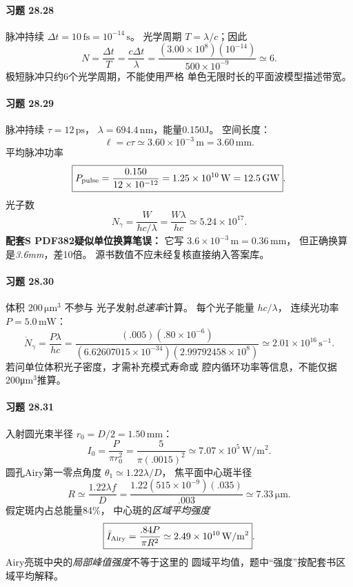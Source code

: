 \paragraph{习题 28.28}
脉冲持续 \(\Delta t=10\,\mathrm{fs}=10^{-14}\,\mathrm s\)。
光学周期 \(T=\lambda/c\)；因此
\[
\boxed{N=\frac{\Delta t}{T}
=\frac{c\Delta t}{\lambda}
=\frac{(3.00\times10^8)(10^{-14})}{500\times10^{-9}}
\simeq6}.
\]
极短脉冲只约6个光学周期，不能使用严格
单色无限时长的平面波模型描述带宽。

\paragraph{习题 28.29}
脉冲持续 \(\tau=12\,\mathrm{ps}\)，
\(\lambda=694.4\,\mathrm{nm}\)，能量0.150J。
空间长度：
\[
\boxed{\ell=c\tau
\simeq3.60\times10^{-3}\,\mathrm m
=3.60\,\mathrm{mm}}.
\]
平均脉冲功率
\[
\boxed{P_{\rm pulse}=\frac{0.150}{12\times10^{-12}}
=1.25\times10^{10}\,\mathrm W=12.5\,\mathrm{GW}}.
\]
光子数
\[
\boxed{N_\gamma=\frac{W}{hc/\lambda}
=\frac{W\lambda}{hc}\simeq5.24\times10^{17}}.
\]
\textbf{配套S PDF382疑似单位换算笔误：}
它写 \(3.6\times10^{-3}\,\mathrm m=0.36\,\mathrm{mm}\)，
但正确换算是\emph{3.6mm}，差10倍。
源书数值不应未经复核直接纳入答案库。

\paragraph{习题 28.30}
体积 \(200\,\mathrm{\mu m^3}\) 不参与
光子发射\emph{总速率}计算。
每个光子能量 \(hc/\lambda\)，
连续光功率 \(P=5.0\,\mathrm{mW}\)：
\[
\boxed{\dot N_\gamma=\frac{P\lambda}{hc}
=\frac{(.005)(.80\times10^{-6})}
{(6.62607015\times10^{-34})(2.99792458\times10^8)}
\simeq2.01\times10^{16}\,\mathrm{s^{-1}}}.
\]
若问单位体积光子密度，才需补充模式寿命或
腔内循环功率等信息，不能仅据200μm$^3$推算。

\paragraph{习题 28.31}
入射圆光束半径 \(r_0=D/2=1.50\,\mathrm{mm}\)：
\[
\boxed{I_0=\frac{P}{\pi r_0^2}
=\frac5{\pi(.0015)^2}
\simeq7.07\times10^5\,\mathrm{W/m^2}}.
\]
圆孔Airy第一零点角度
\(\theta_1\simeq1.22\lambda/D\)，
焦平面中心斑半径
\[
\boxed{R\simeq\frac{1.22\lambda f}{D}
=\frac{1.22(515\times10^{-9})(.035)}{.003}
\simeq7.33\,\mathrm{\mu m}}.
\]
假定斑内占总能量84\%，
中心斑的\emph{区域平均强度}
\[
\boxed{\bar I_{\rm Airy}
=\frac{.84P}{\pi R^2}
\simeq2.49\times10^{10}\,\mathrm{W/m^2}}.
\]
Airy亮斑中央的\emph{局部峰值强度}不等于这里的
圆域平均值，题中“强度”按配套书区域平均解释。

